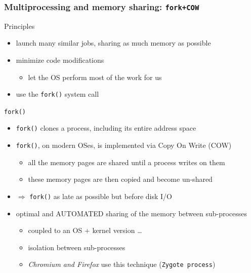 \documentclass[9pt]{beamer}
\begin{document}
\begin{frame}
  \frametitle{Multiprocessing and memory sharing: \texttt{fork+COW}}
  \begin{block}{Principles}

    \begin{itemize}
    \item launch many similar jobs, sharing as much memory as possible
    \item minimize code modifications
      \begin{itemize}
      \item let the OS perform most of the work for us
      \end{itemize}
    \item use the \alert{\texttt{fork()}} system call
    \end{itemize}
  \end{block}

  \begin{block}{\texttt{fork()}}

    \begin{itemize}
    \item \texttt{fork()} clones a process, including its entire address space
    \item \texttt{fork()}, on modern OSes, is implemented via \alert{Copy On Write (COW)}
      \begin{itemize}
      \item all the memory pages are shared until a process writes on them
      \item these memory pages are then copied and become un-shared
      \end{itemize}
    \item $\Rightarrow$ \texttt{fork()} as late as possible \alert{but before} disk I/O
    \item \alert{optimal and AUTOMATED sharing} of the memory between sub-processes
      \begin{itemize}
      \item coupled to an OS + kernel version \ldots{}
      \item isolation between sub-processes
      \item \emph{Chromium and Firefox} use this technique (\texttt{Zygote process})
      \end{itemize}
    \end{itemize}
  \end{block}
\end{frame}
\end{document}
